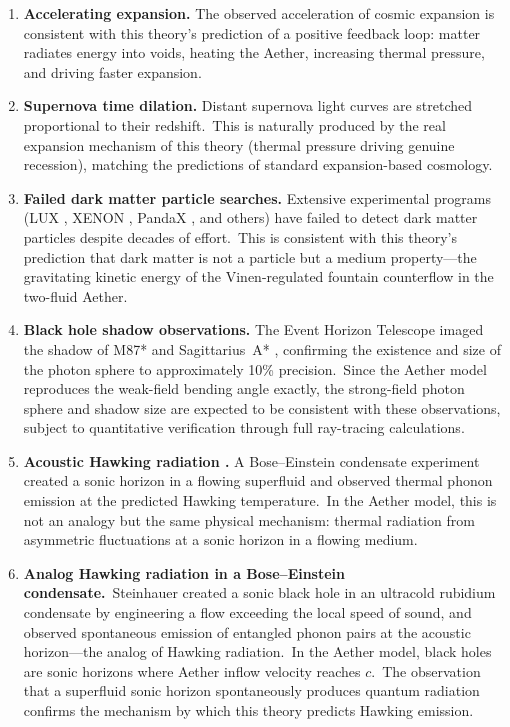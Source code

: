 ﻿\documentclass[12pt,letterpaper]{article}
\begin{document}
\begin{enumerate}[leftmargin=2em]
  \item \textbf{Accelerating expansion.} The observed acceleration of cosmic expansion is consistent
    with this theory's prediction of a positive feedback loop: matter radiates energy
    into voids, heating the Aether, increasing thermal pressure, and driving faster
    expansion.

  \item \textbf{Supernova time dilation.} Distant supernova light curves are stretched proportional to
    their redshift.\ This is naturally produced by the real expansion mechanism of this
    theory (thermal pressure driving genuine recession), matching the predictions of
    standard expansion-based cosmology.

  \item \textbf{Failed dark matter particle searches.} Extensive experimental programs (LUX \cite{lux2017}, XENON \cite{xenon2018},
    PandaX \cite{pandax2017}, and others) have failed to detect dark matter particles despite decades of
    effort.\ This is consistent with this theory's prediction that dark matter is not a
    particle but a medium property---the gravitating kinetic energy of the
    Vinen-regulated fountain counterflow in the two-fluid Aether.

  \item \textbf{Black hole shadow observations.} The Event Horizon Telescope imaged the shadow of
    M87* \cite{eht2019} and Sagittarius~A* \cite{eht2022}, confirming the existence and size of the photon
    sphere to approximately 10\% precision.\ Since the Aether model
    reproduces the weak-field bending angle exactly, the strong-field photon sphere and
    shadow size are expected to be consistent with these observations, subject to
    quantitative verification through full ray-tracing calculations.

  \item \textbf{Acoustic Hawking radiation \cite{steinhauer2019}.} A Bose--Einstein condensate experiment
    created a sonic horizon in a flowing superfluid and observed thermal phonon emission
    at the predicted Hawking temperature.\ In the Aether model, this is not an analogy but
    the same physical mechanism: thermal radiation from asymmetric fluctuations at a sonic
    horizon in a flowing medium.


  \item \textbf{Analog Hawking radiation in a Bose--Einstein condensate.}\
    Steinhauer \cite{steinhauer2016} created a sonic black hole in an ultracold
    rubidium condensate by engineering a flow exceeding the local speed of sound,
    and observed spontaneous emission of entangled phonon pairs at the acoustic
    horizon---the analog of Hawking radiation.\ In the Aether model, black holes
    are sonic horizons where Aether inflow velocity reaches $c$.\ The observation
    that a superfluid sonic horizon spontaneously produces quantum radiation
    confirms the mechanism by which this theory predicts Hawking emission.


\end{enumerate}
\end{document}
